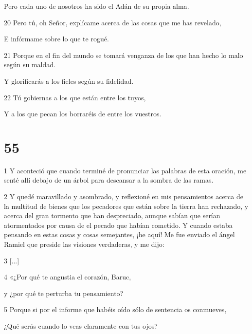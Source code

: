 \par Pero cada uno de nosotros ha sido el Adán de su propia alma.

\par 20 Pero tú, oh Señor, explícame acerca de las cosas que me has revelado,

\par E infórmame sobre lo que te rogué.

\par 21 Porque en el fin del mundo se tomará venganza de los que han hecho lo malo según su maldad.

\par Y glorificarás a los fieles según su fidelidad.

\par 22 Tú gobiernas a los que están entre los tuyos,

\par Y a los que pecan los borraréis de entre los vuestros.

\chapter{55}

\par 1 Y aconteció que cuando terminé de pronunciar las palabras de esta oración, me senté allí debajo de un árbol para descansar a la sombra de las ramas.

\par 2 Y quedé maravillado y asombrado, y reflexioné en mis pensamientos acerca de la multitud de bienes que los pecadores que están sobre la tierra han rechazado, y acerca del gran tormento que han despreciado, aunque sabían que serían atormentados por causa de el pecado que habían cometido. Y cuando estaba pensando en estas cosas y cosas semejantes, ¡he aquí! Me fue enviado el ángel Ramiel que preside las visiones verdaderas, y me dijo:

\par 3 [...]

\par 4 «¿Por qué te angustia el corazón, Baruc,

\par y ¿por qué te perturba tu pensamiento?

\par 5 Porque si por el informe que habéis oído sólo de sentencia os conmueves,

\par ¿Qué serás cuando lo veas claramente con tus ojos?

